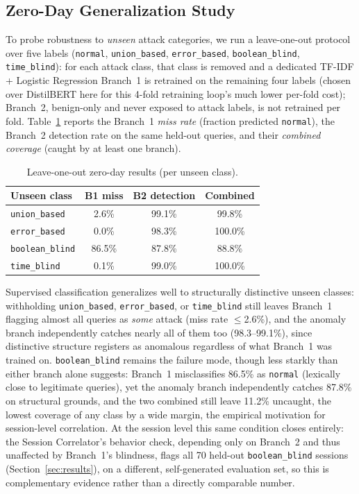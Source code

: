 \documentclass[conference]{IEEEtran}
\begin{document}
\FloatBarrier
\subsection{Zero-Day Generalization Study}
To probe robustness to \emph{unseen} attack categories, we run a leave-one-out protocol over five labels (\texttt{normal}, \texttt{union\_based}, \texttt{error\_based}, \texttt{boolean\_blind}, \texttt{time\_blind}): for each attack class, that class is removed and a dedicated TF-IDF + Logistic Regression Branch~1 is retrained on the remaining four labels (chosen over DistilBERT here for this 4-fold retraining loop's much lower per-fold cost); Branch~2, benign-only and never exposed to attack labels, is not retrained per fold. Table~\ref{tab:zeroday} reports the Branch~1 \emph{miss rate} (fraction predicted \texttt{normal}), the Branch~2 detection rate on the same held-out queries, and their \emph{combined coverage} (caught by at least one branch).

\begin{table}[t]
\caption{Leave-one-out zero-day results (per unseen class).}
\label{tab:zeroday}
\begin{center}
\begin{tabular}{@{}lccc@{}}
\toprule
\textbf{Unseen class} & \textbf{B1 miss} & \textbf{B2 detection} & \textbf{Combined} \\
\midrule
\texttt{union\_based}   & 2.6\%  & 99.1\% & 99.8\% \\
\texttt{error\_based}   & 0.0\%  & 98.3\% & 100.0\% \\
\texttt{boolean\_blind} & 86.5\% & 87.8\% & 88.8\% \\
\texttt{time\_blind}    & 0.1\%  & 99.0\% & 100.0\% \\
\bottomrule
\end{tabular}
\end{center}
\end{table}

Supervised classification generalizes well to structurally distinctive unseen classes: withholding \texttt{union\_based}, \texttt{error\_based}, or \texttt{time\_blind} still leaves Branch~1 flagging almost all queries as \emph{some} attack (miss rate $\leq$2.6\%), and the anomaly branch independently catches nearly all of them too (98.3--99.1\%), since distinctive structure registers as anomalous regardless of what Branch~1 was trained on. \texttt{boolean\_blind} remains the failure mode, though less starkly than either branch alone suggests: Branch~1 misclassifies 86.5\% as \texttt{normal} (lexically close to legitimate queries), yet the anomaly branch independently catches 87.8\% on structural grounds, and the two combined still leave 11.2\% uncaught, the lowest coverage of any class by a wide margin, the empirical motivation for session-level correlation. At the session level this same condition closes entirely: the Session Correlator's behavior check, depending only on Branch~2 and thus unaffected by Branch~1's blindness, flags all 70 held-out \texttt{boolean\_blind} sessions (Section~\ref{sec:results}), on a different, self-generated evaluation set, so this is complementary evidence rather than a directly comparable number.
\end{document}
